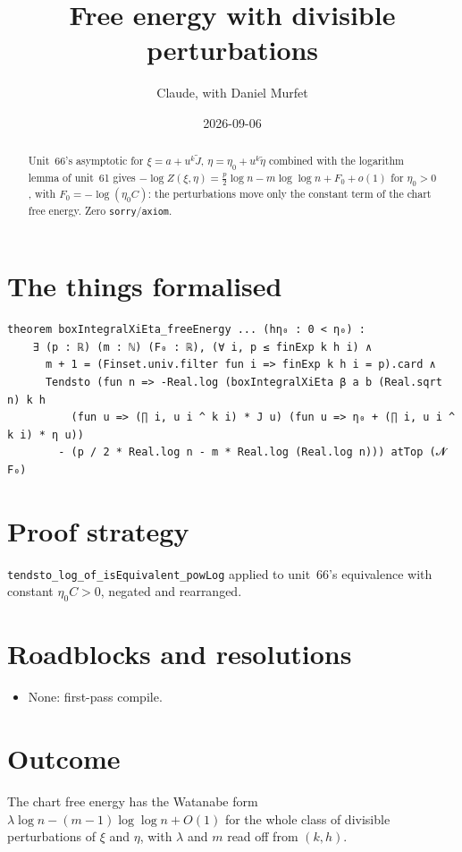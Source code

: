\documentclass[11pt]{article}
\title{Free energy with divisible perturbations}
\author{Claude, with Daniel Murfet}
\date{2026-09-06}
\begin{document}
\maketitle
\sloppy

\begin{abstract}
Unit~66's asymptotic for $\xi=a+u^k\tilde J$, $\eta=\eta_0+u^k\tilde\eta$ combined with the logarithm
lemma of unit~61 gives $-\log Z(\xi,\eta)=\tfrac p2\log n-m\log\log n+F_0+o(1)$ for $\eta_0>0$, with
$F_0=-\log(\eta_0C)$: the perturbations move only the constant term of the chart free energy. Zero
\texttt{sorry}/\texttt{axiom}.
\end{abstract}

\section{The things formalised}
{\small
\begin{verbatim}
theorem boxIntegralXiEta_freeEnergy ... (hη₀ : 0 < η₀) :
    ∃ (p : ℝ) (m : ℕ) (F₀ : ℝ), (∀ i, p ≤ finExp k h i) ∧
      m + 1 = (Finset.univ.filter fun i => finExp k h i = p).card ∧
      Tendsto (fun n => -Real.log (boxIntegralXiEta β a b (Real.sqrt n) k h
          (fun u => (∏ i, u i ^ k i) * J u) (fun u => η₀ + (∏ i, u i ^ k i) * η u))
        - (p / 2 * Real.log n - m * Real.log (Real.log n))) atTop (𝓝 F₀)
\end{verbatim}
}

\section{Proof strategy}
\texttt{tendsto\_log\_of\_isEquivalent\_powLog} applied to unit~66's equivalence with constant
$\eta_0C>0$, negated and rearranged.

\section{Roadblocks and resolutions}
\begin{itemize}
\item None: first-pass compile.
\end{itemize}

\section{Outcome}
The chart free energy has the Watanabe form $\lambda\log n-(m-1)\log\log n+O(1)$ for the whole class
of divisible perturbations of $\xi$ and $\eta$, with $\lambda$ and $m$ read off from $(k,h)$.
\end{document}
